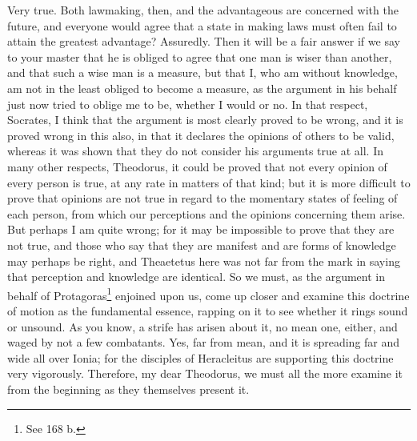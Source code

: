 \documentclass[letterpaper,12pt]{article}
\newcommand{\stephpag}[1]{\marginnote{\small\itshape\fontfamily{ppl}\selectfont #1}}
\begin{document}
\begin{drama}
\theodorusspeaks
Very true.
\socratesspeaks
Both lawmaking, then, and the advantageous are concerned with the future, and everyone would agree that a state in making laws must often fail to attain the greatest advantage?
\theodorusspeaks
Assuredly.
\socratesspeaks
Then it will be a fair answer if we say to your master \stephpag{b} that he is obliged to agree that one man is wiser than another, and that such a wise man is a measure, but that I, who am without knowledge, am not in the least obliged to become a measure, as the argument in his behalf just now tried to oblige me to be, whether I would or no.
\theodorusspeaks
In that respect, Socrates, I think that the argument is most clearly proved to be wrong, and it is proved wrong in this also, in that it declares the opinions of others to be valid, whereas it was shown that they do not consider his arguments true at all. \stephpag{c}
\socratesspeaks
In many other respects, Theodorus, it could be proved that not every opinion of every person is true, at any rate in matters of that kind; but it is more difficult to prove that opinions are not true in regard to the momentary states of feeling of each person, from which our perceptions and the opinions concerning them arise. But perhaps I am quite wrong; for it may be impossible to prove that they are not true, and those who say that they are manifest and are forms of knowledge may perhaps be right, and Theaetetus here was not far from the mark in saying that perception and knowledge are identical. \stephpag{d} So we must, as the argument in behalf of Protagoras\footnote{See 168 b.} enjoined upon us, come up closer and examine this doctrine of motion as the fundamental essence, rapping on it to see whether it rings sound or unsound. As you know, a strife has arisen about it, no mean one, either, and waged by not a few combatants.
\theodorusspeaks
Yes, far from mean, and it is spreading far and wide all over Ionia; for the disciples of Heracleitus are supporting this doctrine very vigorously.
\socratesspeaks
Therefore, my dear Theodorus, we must all the more examine it \stephpag{e} from the beginning as they themselves present it.
\theodorusspeaks

\end{drama}
\end{document}

